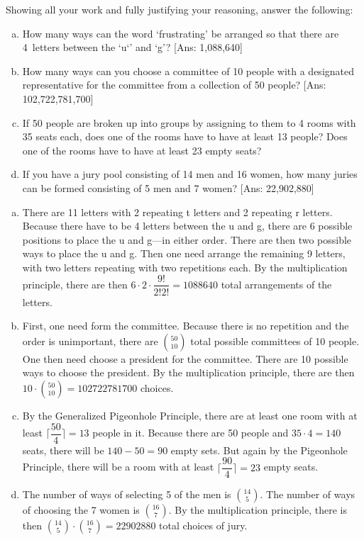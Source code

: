 \documentclass[11pt,letterpaper]{article}
\begin{document}
 Showing all your work and fully justifying your reasoning, answer the following:
	\begin{enumerate}[(a)]
	\item How many ways can the word `frustrating' be arranged so that there are 4~letters between the `u`' and `g'? [Ans: 1,088,640]
	\item How many ways can you choose a committee of 10 people with a designated representative for the committee from a collection of 50 people? [Ans: 102,722,781,700]
	\item If 50 people are broken up into groups by assigning to them to 4 rooms with 35 seats each, does one of the rooms have to have at least 13 people? Does one of the rooms have to have at least 23 empty seats?
	\item If you have a jury pool consisting of 14 men and 16 women, how many juries can be formed consisting of 5 men and 7 women? [Ans: 22,902,880]
	\end{enumerate} \pspace

\sol 
\begin{enumerate}[(a)]
\item There are 11 letters with 2 repeating t letters and 2 repeating r letters. Because there have to be 4 letters between the u and g, there are 6 possible positions to place the u and g---in either order. There are then two possible ways to place the u and g. Then one need arrange the remaining 9 letters, with two letters repeating with two repetitions each. By the multiplication principle, there are then $6 \cdot 2 \cdot \dfrac{9!}{2! 2!}= 1088640$ total arrangements of the letters. \pspace
 
\item First, one need form the committee. Because there is no repetition and the order is unimportant, there are $\binom{50}{10}$ total possible committees of 10 people. One then need choose a president for the committee. There are 10 possible ways to choose the president. By the multiplication principle, there are then $10 \cdot \binom{50}{10}= 102722781700$ choices. \pspace

\item By the Generalized Pigeonhole Principle, there are at least one room with at least $\lceil \dfrac{50}{4} \rceil= 13$ people in it. Because there are 50 people and $35 \cdot 4= 140$ seats, there will be $140 - 50= 90$ empty sets. But again by the Pigeonhole Principle, there will be a room with at least $\lceil \dfrac{90}{4} \rceil= 23$ empty seats. \pspace

\item The number of ways of selecting 5 of the men is $\binom{14}{5}$. The number of ways of choosing the 7 women is $\binom{16}{7}$. By the multiplication principle, there is then $\binom{14}{5} \cdot \binom{16}{7}= 22902880$ total choices of jury. 
\end{enumerate}
\end{document}
